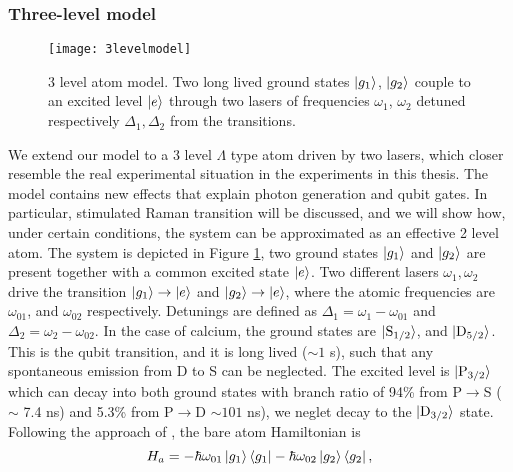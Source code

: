 \subsubsection{Three-level model}
\label{sec:threelevel}
\begin{figure}
\centering
\texttt{[image: 3levelmodel]}
\caption{3 level atom model. Two long lived ground states $\ket{g_1}$, $\ket{g_2}$ couple to an excited level $\ket{e}$ through two lasers of frequencies $\omega_1$, $\omega_2$ detuned respectively $\Delta_1,\Delta_2$ from the transitions.}
\label{3levelmodel}
\end{figure}
We extend our model to a 3 level $\Lambda$ type atom driven by two lasers, which closer resemble the real experimental situation in the experiments in this thesis. The model contains new effects that explain photon generation and qubit gates. In particular, stimulated Raman transition will be discussed, and we will show how, under certain conditions, the system can be approximated as an effective 2 level atom. The system is depicted in Figure \ref{3levelmodel}, two ground states $\ket{g_1}$ and $\ket{g_2}$ are present together with a common excited state $\ket{e}$. Two different lasers $\omega_1,\omega_2$ drive the transition $\ket{g_1} \to \ket{e}$ and $\ket{g_2} \to \ket{e}$, where the atomic frequencies are $\omega_{01}$, and $\omega_{02}$ respectively. Detunings are defined as $\Delta_1 = \omega_1 - \omega_{01}$ and $\Delta_2 = \omega_2 - \omega_{02}$. In the case of calcium, the ground states are $\ket{\text{S}_{1/2}}$, and $\ket{\text{D}_{5/2}}$. This is the qubit transition, and it is long lived ($\sim 1$ s), such that any spontaneous emission from D to S can be neglected. The excited level is $\ket{\text{P}_{3/2}}$ which can decay into both ground states with branch ratio of 94\% from P$\to$S ($\sim$ 7.4 ns) and 5.3\% from P$\to$D $\sim 101$ ns), we neglet decay to the $\ket{\text{D}_{3/2}}$ state.\\
Following the approach of \cite{steck}, the bare atom Hamiltonian is
\begin{equation}
H_a = -\hbar \omega_{01}\ket{g_1}\bra{g_1} - \hbar \omega_{02}\ket{g_2}\bra{g_2},
\end{equation}
